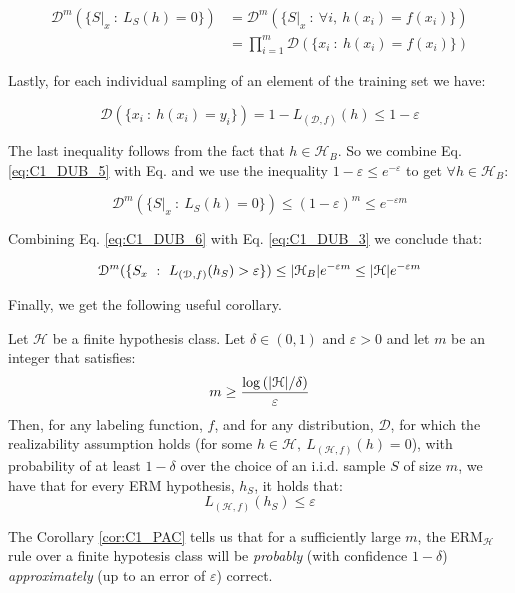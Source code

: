 \documentclass[../../main/main.tex]{subfiles}
\begin{document}
\begin{align}
    \mathcal{D}^m (\{ S|_x \ : \ L_S(h) = 0 \})
    &=
    \mathcal{D}^m (\{ S|_x \ : \ \forall i, \ h(x_i) = f(x_i) \})   \\
    &=
    \prod_{i=1}^{m} \mathcal{D}(\{ x_i \ : \ h(x_i) = f(x_i) \})
    \label{eq:C1_DUB_4}
\end{align}

Lastly, for each individual sampling of an element of the training set we have:

\begin{equation}
    \mathcal{D}(\{ x_i \ : \ h(x_i) = y_i \})
    =
    1 - L_{(\mathcal{D},f)} (h)
    \le
    1 - \varepsilon
    \label{eq:C1_DUB_5}
\end{equation}

The last inequality follows from the fact that \( h \in \mathcal{H}_B \). So we combine Eq. \ref{eq:C1_DUB_5} with Eq. \label{eq:C1_DUB_4} and we use the inequality \( 1 - \varepsilon \le e^{-\varepsilon} \) to get \( \forall h \in \mathcal{H}_B \):

\begin{equation}
    \mathcal{D}^m (\{ S|_x \ : \ L_S(h) = 0 \})
    \le
    (1 - \varepsilon)^m
    \le
    e^{-\varepsilon m}
    \label{eq:C1_DUB_6}
\end{equation}

Combining Eq. \ref{eq:C1_DUB_6} with Eq. \ref{eq:C1_DUB_3} we conclude that:

\begin{equation}
    \mathcal{D}^m (\{ S_x \ : \ L_{(\mathcal{D},f)}(h_S) > \varepsilon \})
    \le
    \abs{\mathcal{H}_B} e^{- \varepsilon m}
    \le
    \abs{\mathcal{H}} e^{- \varepsilon m}
    \label{eq:C1_DUB_7}
\end{equation}

Finally, we get the following useful corollary.

\begin{corollary}[]
    \label{cor:C1_PAC}
    Let \( \mathcal{H} \) be a finite hypothesis class. Let \( \delta \in (0,1) \) and \( \varepsilon > 0 \) and let \( m \) be an integer that satisfies:
    \[
        m \ge \frac{\log{(\abs{\mathcal{H}} / \delta)}}{\varepsilon}
    \]
    Then, for any labeling function, \( f \), and for any distribution, \( \mathcal{D} \), for which the realizability assumption holds (for some \( h \in \mathcal{H}, \ L_{(\mathcal{H},f)}(h) = 0 \)), with probability of at least \( 1 - \delta \) over the choice of an i.i.d. sample \( S \) of size \( m \), we have that for every ERM hypothesis, \( h_S \), it holds that:
    \[
        L_{(\mathcal{H},f)}(h_S) \le \varepsilon
    \]
\end{corollary}

The Corollary \ref{cor:C1_PAC} tells us that for a sufficiently large \( m \), the ERM$_ \mathcal{H}$ rule over a finite hypotesis class will be \emph{probably} (with confidence \( 1 - \delta \)) \emph{approximately} (up to an error of \( \varepsilon \)) correct.
\end{document}
